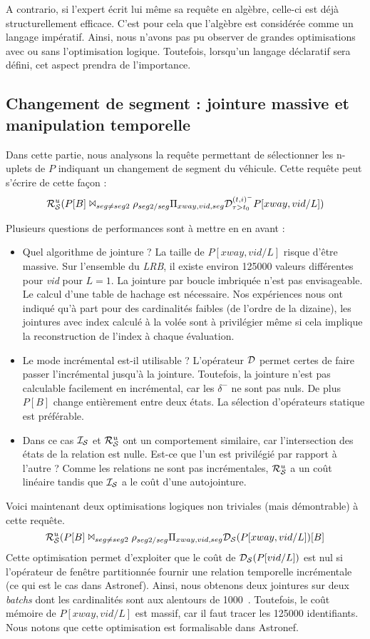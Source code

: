 A contrario, si l'expert écrit lui même sa requête en algèbre, celle-ci est déjà structurellement efficace. C'est pour cela que l'algèbre est considérée comme un langage impératif. Ainsi, nous n'avons pas pu observer de grandes optimisations avec ou sans l'optimisation logique. Toutefois, lorsqu'un langage déclaratif sera défini, cet aspect prendra de l'importance.

\subsection{Changement de segment : jointure massive et manipulation temporelle}
Dans cette partie, nous analysons la requête permettant de sélectionner les n-uplets de $P$ indiquant un changement de segment du véhicule. Cette requête peut s'écrire de cette façon : $$\mathcal{R}_{\mathcal S}^{u}(P[B] \Join_{seg\neq seg2} \rho_{seg2/seg} \Pi_{xway,vid,seg} \mathcal{D}^{(t,i)^-}_{\tau>t_0} P[xway,vid/L])$$

Plusieurs questions de performances sont à mettre en en avant :
\begin{itemize}
	\item Quel algorithme de jointure ? La taille de $P[xway,vid/L]$ risque d'être massive. Sur l'ensemble du \textit{LRB}, il existe environ 125000 valeurs différentes pour \textit{vid} pour $L=1$. La jointure par boucle imbriquée n'est pas envisageable. Le calcul d'une table de hachage est nécessaire. Nos expériences nous ont indiqué qu'à part pour des cardinalités faibles (de l'ordre de la dizaine), les jointures avec index calculé à la volée sont à privilégier même si cela implique la reconstruction de l'index à chaque évaluation.
	\item Le mode incrémental est-il utilisable ? L'opérateur $\mathcal{D}$ permet certes de faire passer l'incrémental jusqu'à la jointure. Toutefois, la jointure n'est pas calculable facilement en incrémental, car les $\delta^-$ ne sont pas nuls. De plus $P[B]$ change entièrement entre deux états. La sélection d'opérateurs statique est préférable.
	\item Dans ce cas $\mathcal{I_S}$ et $\mathcal{R}_{\mathcal S}^{u}$ ont un comportement similaire, car l'intersection des états de la relation est nulle. Est-ce que l'un est privilégié par rapport à l'autre ? Comme les relations ne sont pas incrémentales, $\mathcal{R}_{\mathcal S}^{u}$ a un coût linéaire tandis que $\mathcal{I_S}$ a le coût d'une autojointure.
\end{itemize}

Voici maintenant deux optimisations logiques non triviales (mais démontrable) à cette requête.
$$\mathcal{R}_{\mathcal S}^{u}(P[B] \Join_{seg\neq seg2} \rho_{seg2/seg} \Pi_{xway,vid,seg} \mathcal{D_S}(P[xway,vid/L])[B]$$
Cette optimisation permet d'exploiter que le coût de $\mathcal{D_S}(P[vid/L])$ est nul si l'opérateur de fenêtre partitionnée fournir une relation temporelle incrémentale (ce qui est le cas dans Astronef). Ainsi, nous obtenons deux jointures sur deux \textit{batchs} dont les cardinalités sont aux alentours de 1000~\cite{Jain:lrb}. Toutefois, le coût mémoire de $P[xway,vid/L]$ est massif, car il faut tracer les 125000 identifiants. Nous notons que cette optimisation est formalisable dans Astronef.

